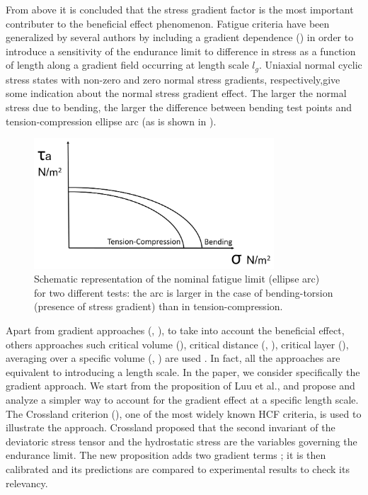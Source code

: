 From above it is concluded that the stress gradient factor is the most important contributer to the beneficial effect phenomenon. Fatigue criteria have been generalized by several authors by including a  gradient dependence (\cite{Papadopoulos1996513}) in order to introduce a sensitivity of the endurance limit to difference in stress as a function of length along a gradient field occurring at length scale  $l_g$. Uniaxial normal cyclic stress states with non-zero and zero normal stress gradients, respectively,give some indication about the normal stress gradient effect. The larger the normal stress due to bending, the larger the difference between bending test points and tension-compression ellipse arc (as is shown in ).
\begin{figure}[!h]
	\centering
	\includegraphics[width=0.8\textwidth]{figures//fig2.jpg} 
	\caption{Schematic representation of the nominal fatigue limit (ellipse arc) for two different tests: the arc is larger in the case of bending-torsion (presence of stress gradient) than in tension-compression.}
	\label{fig2}
\end{figure}

Apart from gradient approaches (\cite{Amargier20101904}, \cite{Papadopoulos1996513}), to take into account the beneficial effect, others approaches such critical volume (\cite{maitournam2009fatigue}), critical distance (\cite{taylor2010theory}, \cite{Araujo200795}), critical layer (\cite{flavenot1983epaisseur}), averaging over a specific volume (\cite{palin2000stress}, \cite{Banvillet2003755}) are used . In fact, all the approaches are equivalent to introducing a length scale. 
In the paper, we consider specifically the gradient approach. We start from the proposition of Luu et al., and propose and analyze a simpler way to account for the gradient effect at a specific length scale. The Crossland criterion (\cite{crossland1956effect}), one of the most widely known HCF criteria, is used to illustrate the approach. Crossland proposed that the second invariant of the deviatoric stress tensor and the hydrostatic stress are the variables governing the endurance limit. 
The new proposition adds two gradient terms ; it is then calibrated and its predictions are compared to experimental results to check its relevancy.



